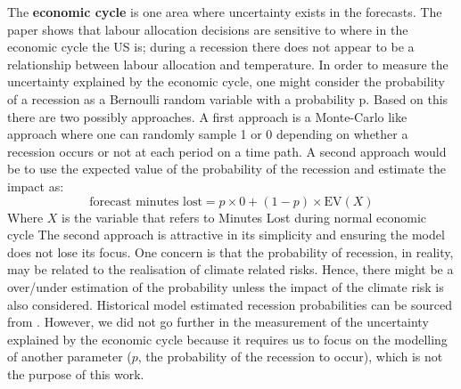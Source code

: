 The \textbf{economic cycle} is one area where uncertainty exists in the forecasts.
The paper shows that labour allocation decisions are sensitive to where in the economic cycle the US is; during a recession there does not appear to be a relationship between labour allocation and temperature. In order to measure the uncertainty explained by the economic cycle, one might consider the probability of a recession as a Bernoulli random variable with a probability p. Based on this there are two possibly approaches. A first approach is a Monte-Carlo like approach where one can randomly sample 1 or 0 depending on whether a recession occurs or not at each period on a time path. A second approach would be to use the expected value of the probability of the recession and estimate the impact as:
\begin{equation}
    \label{Eq:economiccycle}
        \text{forecast minutes lost} = p \times 0 + (1-p) \times \text{EV}\left(X\right)
\end{equation}
Where $X$ is the variable that refers to Minutes Lost during normal economic cycle
The second approach is attractive in its simplicity and ensuring the model does not lose its focus.
One concern is that the probability of recession, in reality, may be related to the realisation of climate related risks. Hence, there might be a over/under estimation of the probability unless the impact of the climate risk is also considered. Historical model estimated recession probabilities can be sourced from \cite{ChauvetEtAl:2024}. However, we did not go further in the measurement of the uncertainty explained by the economic cycle because it requires us to focus on the modelling of another parameter ($p$, the probability of the recession to occur), which is not the purpose of this work.

